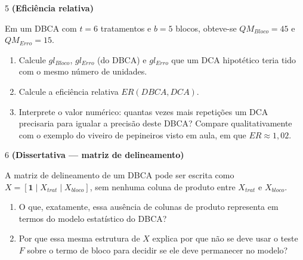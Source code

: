 \documentclass[11pt]{article}
\begin{document}
\begin{questao}{5} \textbf{(Eficiência relativa)}

Em um DBCA com $t=6$ tratamentos e $b=5$ blocos, obteve-se $QM_{Bloco}=45$ e $QM_{Erro}=15$.

\begin{enumerate}[label=(\alph*)]
  \item Calcule $gl_{Bloco}$, $gl_{Erro}$ (do DBCA) e $gl_{Erro}$ que um DCA hipotético teria
    tido com o mesmo número de unidades.
  \item Calcule a eficiência relativa $ER(DBCA,DCA)$.
  \item Interprete o valor numérico: quantas vezes mais repetições um DCA precisaria para igualar
    a precisão deste DBCA? Compare qualitativamente com o exemplo do viveiro de pepineiros visto
    em aula, em que $ER\approx1{,}02$.
\end{enumerate}
\end{questao}

\begin{questao}{6} \textbf{(Dissertativa --- matriz de delineamento)}

A matriz de delineamento de um DBCA pode ser escrita como $X=[\mathbf 1\mid X_{trat}\mid
X_{bloco}]$, sem nenhuma coluna de produto entre $X_{trat}$ e $X_{bloco}$.

\begin{enumerate}[label=(\alph*)]
  \item O que, exatamente, essa ausência de colunas de produto representa em termos do modelo
    estatístico do DBCA?
  \item Por que essa mesma estrutura de $X$ explica por que não se deve usar o teste $F$ sobre o
    termo de bloco para decidir se ele deve permanecer no modelo?
\end{enumerate}
\end{questao}
\end{document}
